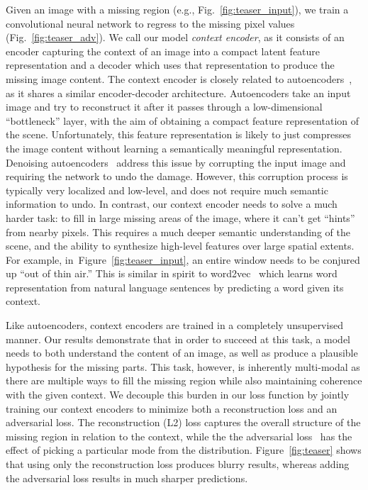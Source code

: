 \documentclass[10pt,twocolumn,letterpaper]{article}
\newcommand{\reffig}[1]{Figure~\ref{fig:#1}}
\newcommand{\shortreffig}[1]{Fig.~\ref{fig:#1}}
\begin{document}
Given an image with a missing region (e.g., \shortreffig{teaser_input}), we train a convolutional neural network to regress to the missing pixel values (\shortreffig{teaser_adv}).
We call our model \textit{context encoder}, as it consists of an encoder capturing the context of an image into a compact latent feature representation and a decoder which uses that representation to produce the missing image content.
The context encoder is closely related to autoencoders~\cite{hintonautoenc,bengio2009learning}, as it shares a similar encoder-decoder architecture.
Autoencoders take an input image and try to reconstruct it after it passes through a low-dimensional ``bottleneck'' layer, with the aim of obtaining a compact feature representation of the scene.
Unfortunately, this feature representation is likely to just compresses the image content without learning a semantically meaningful representation.
Denoising autoencoders~\cite{denoising} address this issue by corrupting the input image and requiring the network to undo the damage.
However, this corruption process is typically very localized and low-level, and does not require much semantic information to undo.
In contrast, our context encoder needs to solve a much harder task: to fill in large missing areas of the image, where it can't get ``hints'' from nearby pixels.
This requires a much deeper semantic understanding of the scene, and the ability to synthesize high-level features over large spatial extents.
For example, in~\reffig{teaser_input}, an entire window needs to be conjured up ``out of thin air.''  This is similar in spirit to word2vec~\cite{mikolov2013distributed} which learns word representation from natural language sentences by predicting a word given its context.

Like autoencoders, context encoders are trained in a completely unsupervised manner.
Our results demonstrate that in order to succeed at this task, a model needs to both understand the content of an image, as well as produce a plausible hypothesis for the missing parts.
This task, however, is inherently multi-modal as there are multiple ways to fill the missing region while also maintaining coherence with the given context.
We decouple this burden in our loss function by jointly training our context encoders to minimize both a reconstruction loss and an adversarial loss.
The reconstruction (L2) loss captures the overall structure of the missing region in relation to the context, while the the adversarial loss~\cite{goodfellow2014generative}
has the effect of picking a particular mode from the distribution.  \reffig{teaser} shows that using only the reconstruction loss produces blurry results, whereas adding the adversarial loss results in much sharper predictions.
\end{document}
